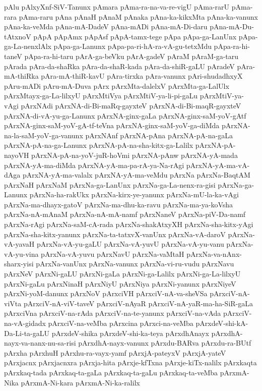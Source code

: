 {pAlu
pAlxyXnf-SiV-Tanunx
pAmara
pAma-ra-na-va-re-vigU
pAma-rarU
pAma-rara
pAma-raru
pAna
pAnaH
pAnaM
pAnaka
pAna-ka-kikxMta
pAna-ka-vanunx
pAna-ka-veMda
pAna-mA-DadeV
pAna-mADi
pAna-mA-Di-daru
pAna-mA-Du-tAtxnoV
pApA
pApAmx
pApAsf
pApA-tamx-tege
pApa
pApa-ga-LanUnx
pApa-ga-La-nenxlAlx
pApa-ga-Lanunx
pApa-pa-ri-hA-ra-vA-gu-tetxMdu
pApa-ra-hi-taneV
pApa-ra-hi-taru
pArA-ga-beVku
pArA-gadeV
pAraM
pAraM-ga-taru
pArada
pAra-da-shaRka
pAra-da-shaR-kada
pAra-da-shiR-gaLU
pAradeV
pAra-mA-thiRka
pAra-mA-thiR-kavU
pAra-tirxka
pAra-vanunx
pAri-shudadhxyX
pAru-mADi
pAru-mA-Duva
pArx
pArxMta-dalelxV
pArxMta-ga-LalUlx
pArxMtayx-ga-La-lilxyU
pArxMtiVya
pArxMtiV-ya-li-pi-gaLu
pArxMtiV-ya-vAgi
pArxNAdi
pArxNA-di-Bi-maRq-gayxteV
pArxNA-di-Bi-maqR-gayxteV
pArxNA-di-vA-yu-ga-Lanunx
pArxNA-ginx-gaLa
pArxNA-ginx-saM-yoV-gAtf
pArxNA-ginx-saM-yoV-gA-tf-teVna
pArxNA-ginx-saM-yoV-ga-diMda
pArxNA-na-la-saM-yoV-ga-vanunx
pArxNAnf
pArxNA-pAna
pArxNA-pA-na-gaLa
pArxNA-pA-na-ga-Lanunx
pArxNA-pA-na-sha-kitx-ga-Lalilx
pArxNA-pA-nayoVH
pArxNA-pA-na-yoV-juR-hoVmi
pArxNA-pAnw
pArxNA-yA-mada
pArxNA-yA-ma-diMda
pArxNA-yA-ma-pa-rA-ya-Na-rAgi
pArxNA-yA-ma-vA-dAga
pArxNA-yA-ma-valalx
pArxNA-yA-ma-veMdu
pArxNa
pArxNa-BaqtAM
pArxNaH
pArxNaM
pArxNa-ga-LanUnx
pArxNa-ga-La-nenx-ra-gisi
pArxNa-ga-Lanunx
pArxNa-ha-rakUkx
pArxNa-kirx-ye-yanunx
pArxNa-mU-la-ka-vAgi
pArxNa-ma-dhayx-gatoV
pArxNa-ma-dhu-ka-ravu
pArxNa-ma-ya-koVsha
pArxNa-nA-mAnaM
pArxNa-nA-mA-namf
pArxNaneV
pArxNa-piV-Da-namf
pArxNa-rAgi
pArxNa-saM-cA-rada
pArxNa-shakAtxyXH
pArxNa-sha-kitx-yAgi
pArxNa-sha-kitx-yanunx
pArxNa-ta-tatxvX-vanUnx
pArxNa-vA-daroV
pArxNa-vA-yavaH
pArxNa-vA-yu-gaLU
pArxNa-vA-yuvU
pArxNa-vA-yu-vanu
pArxNa-vA-yu-vina
pArxNa-vA-yuvu
pArxNavU
pArxNa-vaMtaH
pArxNa-va-nAnx-sharx-yisi
pArxNa-vanUnx
pArxNa-vanunx
pArxNa-vi-ru-vudu
pArxNavu
pArxNeV
pArxNi-gaLU
pArxNi-gaLa
pArxNi-ga-Lalilx
pArxNi-ga-La-lilxyU
pArxNi-gaLu
pArxNinaH
pArxNiyU
pArxNiya
pArxNi-yanunx
pArxNiyeV
pArxNi-yoM-danunx
pArxNoV
pArxciVH
pArxciV-nA-va-sheVSa
pArxciV-nA-viVta
pArxciV-nA-viV-taveV
pArxciV-nAyaR
pArxciV-nA-yaR-ma-ha-SiR-gaLa
pArxciVna
pArxciV-na-rAda
pArxciV-na-te-yanunx
pArxciV-na-vAda
pArxciV-na-vA-gidadx
pArxciV-na-veMba
pArxcina
pArxci-na-veMba
pArxdeV-shi-kA-Da-Li-ta-gaLU
pArxdeV-shika
pArxdeV-shi-ka-teya
pArxdhAnayx
pArxdhA-nayx-va-nanx-nu-sa-risi
pArxdhA-nayx-vanunx
pArxdu-BARva
pArxdu-ra-BUtf
pArxha
pArxhuH
pArxhu-ra-vayx-yamf
pArxjA-pateyxV
pArxjA-yateV
pArxjacnx
pArxjacnxra
pArxja-hita
pArxje-kfTxna
pArxje-kiTx-nalilx
pArxkaqta
pArxkaq-tada
pArxkaq-ta-gaLa
pArxkaq-ta-gaLu
pArxkaq-ta-veMba
pArxmA-Nika
pArxmA-Ni-kara
pArxmA-Ni-ka-ralilx
}

